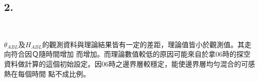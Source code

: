 \documentclass{article}
\begin{document}
\begin{CJK*}{UTF8}{bsmi}
\section*{2.}

\begin{figure}[!htbp]
    \centering
\end{figure}
\;\\
\begin{spacing}{2}
    \begin{large}
    \;$\theta_{ABL}$及$H_{ABL}$的觀測資料與理論結果皆有一定的差距，理論值皆小於觀測值。其走向符合因Ｑ隨時間增加
    而增加。而理論數值較低的原因可能來自於拿06時的探空資料做計算的這個初始設定。因06時之邊界層較穩定，能使邊界層均勻混合的可感熱在每個時間
    點不成比例。
    \end{large}
\end{spacing}



\end{CJK*}
\end{document}
